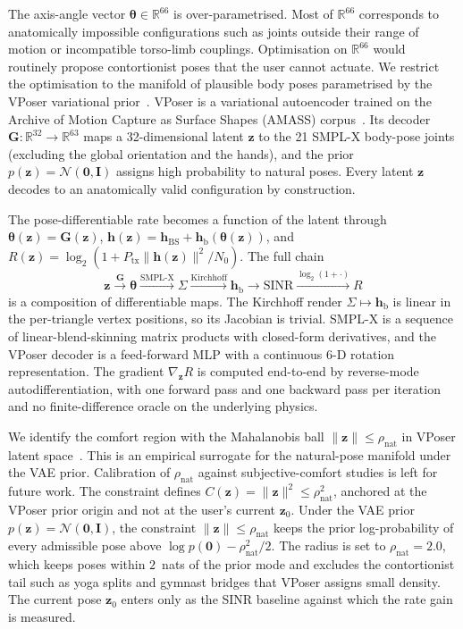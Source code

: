 \documentclass[journal,twocolumn,10pt]{IEEEtran}
\theoremstyle{plain}
\theoremstyle{definition}
\theoremstyle{remark}
\newcommand{\hh}{\bm{h}}
\newcommand{\thetab}{\bm{\theta}}
\newcommand{\hBS}{\bm{h}_{\mathrm{BS}}}
\newcommand{\hbody}{\bm{h}_{\mathrm{b}}}
\newcommand{\Reals}{\mathbb{R}}
\begin{document}
The axis-angle vector $\thetab \in \Reals^{66}$ is over-parametrised.
Most of $\Reals^{66}$ corresponds to anatomically impossible
configurations such as joints outside their range of motion or
incompatible torso-limb couplings. Optimisation on $\Reals^{66}$
would routinely propose contortionist poses that the user cannot
actuate. We restrict the optimisation to the manifold of plausible
body poses parametrised by the VPoser variational
prior~\cite{Pavlakos2019VPoser}. VPoser is a variational autoencoder
trained on the Archive of Motion Capture as Surface Shapes
(AMASS) corpus~\cite{AMASS2019}. Its
decoder $\bm{G}: \Reals^{32} \to \Reals^{63}$ maps a 32-dimensional
latent $\bm{z}$ to the 21 SMPL-X body-pose joints (excluding the
global orientation and the hands), and the prior
$p(\bm{z}) = \mathcal{N}(\bm{0}, \bm{I})$ assigns high probability
to natural poses. Every latent $\bm{z}$ decodes to an anatomically
valid configuration by construction.

The pose-differentiable rate becomes a function of the latent
through $\thetab(\bm{z}) = \bm{G}(\bm{z})$,
$\hh(\bm{z}) = \hBS + \hbody(\thetab(\bm{z}))$, and
$R(\bm{z}) = \log_2(1 + P_{\mathrm{tx}}\|\hh(\bm{z})\|^{2}/N_0)$.
The full chain
\begin{equation}\label{eq:autodiff-chain}
\bm{z} \xrightarrow{\bm{G}} \thetab \xrightarrow{\mathrm{SMPL\text{-}X}}
\Sigma \xrightarrow{\mathrm{Kirchhoff}} \hbody \xrightarrow{}
\mathrm{SINR} \xrightarrow{\log_2(1 + \cdot)} R
\end{equation}
is a composition of differentiable maps. The Kirchhoff render
$\Sigma \mapsto \hbody$ is linear in the per-triangle vertex
positions, so its Jacobian is trivial. SMPL-X is a sequence of
linear-blend-skinning matrix products with closed-form derivatives,
and the VPoser decoder is a feed-forward MLP with a continuous
6-D rotation representation. The gradient $\nabla_{\bm{z}} R$ is
computed end-to-end by reverse-mode autodifferentiation, with one
forward pass and one backward pass per iteration and no
finite-difference oracle on the underlying physics.

We identify the comfort region with the Mahalanobis ball
$\|\bm{z}\| \leq \rho_\mathrm{nat}$ in VPoser latent
space~\cite{Pavlakos2019VPoser}. This is an empirical surrogate for
the natural-pose manifold under the VAE prior. Calibration of
$\rho_\mathrm{nat}$ against subjective-comfort studies is left for
future work. The constraint defines
$C(\bm{z}) = \|\bm{z}\|^{2} \leq \rho_\mathrm{nat}^{2}$, anchored
at the VPoser prior origin and not at the user's current $\bm{z}_0$.
Under the VAE prior
$p(\bm{z}) = \mathcal{N}(\bm{0},\bm{I})$, the constraint
$\|\bm{z}\| \leq \rho_\mathrm{nat}$ keeps the prior log-probability
of every admissible pose above
$\log p(\bm{0}) - \rho_\mathrm{nat}^{2}/2$. The radius is set to
$\rho_\mathrm{nat} = 2.0$, which keeps poses within $2$~nats of the
prior mode and excludes the contortionist tail such as yoga splits
and gymnast bridges that VPoser assigns small density. The current
pose $\bm{z}_0$ enters only as the SINR baseline against which the
rate gain is measured.
\end{document}
